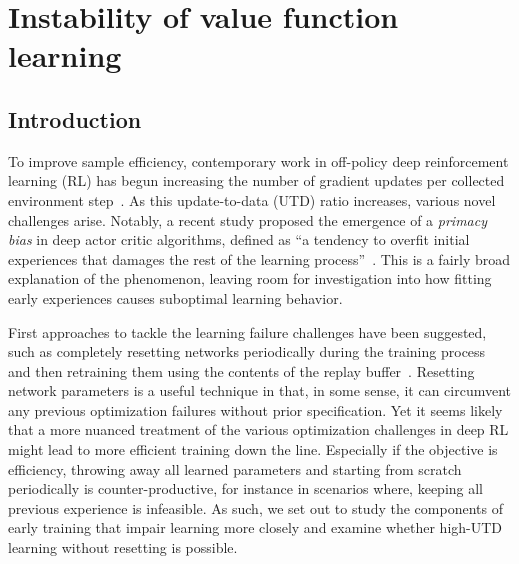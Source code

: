 \chapter{Instability of value function learning}

\section{Introduction} \label{sec:intro}

To improve sample efficiency, contemporary work in off-policy deep reinforcement learning (RL) has begun increasing the number of gradient updates per collected environment step~\parencite{janner2019mbpo,fedus2020revisiting,chen2021randomized, hiraoka2022dropout, nikishin2022primacy, doro2023barrier, schwarzer2023bigger, kim2023resetensemble}.  
As this update-to-data (UTD) ratio increases, various novel challenges arise.
Notably, a recent study proposed the emergence of a \emph{primacy bias} in deep actor critic algorithms, defined as ``a tendency to overfit initial experiences that damages the rest of the learning process''~\parencite{nikishin2022primacy}. 
This is a fairly broad explanation of the phenomenon, leaving room for investigation into how fitting early experiences causes suboptimal learning behavior.

First approaches to tackle the learning failure challenges have been suggested, such as completely resetting networks periodically during the training process and then retraining them using the contents of the replay buffer~\parencite{nikishin2022primacy, doro2023barrier}. 
Resetting network parameters is a useful technique in that, in some sense, it can circumvent any previous optimization failures without prior specification. 
Yet it seems likely that a more nuanced treatment of the various optimization challenges in deep RL might lead to more efficient training down the line. 
Especially if the objective is efficiency, throwing away all learned parameters and starting from scratch periodically is counter-productive, for instance in scenarios where, keeping all previous experience is infeasible. %
As such, we set out to study the components of early training that impair learning more closely and examine whether high-UTD learning without resetting is possible. 



